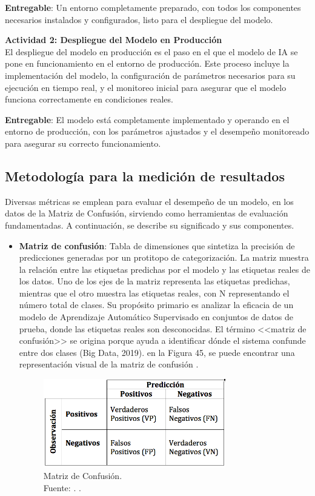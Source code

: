 \textbf{Entregable}: Un entorno completamente preparado, con todos los componentes necesarios instalados y configurados, listo para el despliegue del modelo.

\vspace{0.25cm}
\textbf{Actividad 2: Despliegue del Modelo en Producción}
\\
El despliegue del modelo en producción es el paso en el que el modelo de IA se pone en funcionamiento en el entorno de producción. Este proceso incluye la implementación del modelo, la configuración de parámetros necesarios para su ejecución en tiempo real, y el monitoreo inicial para asegurar que el modelo funciona correctamente en condiciones reales.

\textbf{Entregable}: El modelo está completamente implementado y operando en el entorno de producción, con los parámetros ajustados y el desempeño monitoreado para asegurar su correcto funcionamiento.

\vspace{0.5cm}
\subsection{Metodología para la medición de resultados}
Diversas métricas se emplean para evaluar el desempeño de un modelo, en los datos de la Matriz de Confusión, sirviendo como herramientas de evaluación fundamentadas. A continuación, se describe su significado y sus componentes.

\begin{itemize}
\item \textbf{Matriz de confusión}: Tabla de dimensiones que sintetiza la precisión de predicciones generadas por un protitopo de categorización. La matriz muestra la relación entre las etiquetas predichas por el modelo y las etiquetas reales de los datos. Uno de los ejes de la matriz representa las etiquetas predichas, mientras que el otro muestra las etiquetas reales, con N representando el número total de clases. Su propósito primario es analizar la eficacia de un modelo de Aprendizaje Automático Supervisado en conjuntos de datos de prueba, donde las etiquetas reales son desconocidas. El término <<matriz de confusión>> se origina porque ayuda a identificar dónde el sistema confunde entre dos clases (Big Data, 2019). en la Figura 45, se puede encontrar una representación visual de la matriz de confusión .
\begin{figure}[H]
	\centering
	\includegraphics[width=0.75\textwidth]{3/figures/matriz_confusion.png}
	\caption[Matriz de Confusión]{Matriz de Confusión.\\ Fuente: \cite{gl_izco2018bdc}. .}
	\label{3:9}
\end{figure}
\end{itemize}

